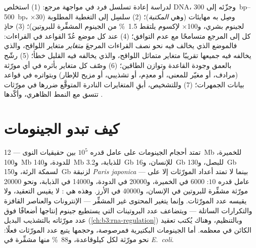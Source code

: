 \begin{method}\label{met:b3:genomics:pipeline}
لدراسة إعادة تسلسل فرد في مواجهة مرجع: (1)
استخلص DNA، وجزّئه إلى \qtyrange{300}{500}{bp}، وصِل به مهايئات
(وهي \emph{المكتبة})؛ (2) سلسِل إلى التغطية المطلوبة (30$\times$
لجينوم بشري، و100$\times$ لإكسوم يلتقط
\qty{1.5}{\%} من الجينوم المشفِّرة للبروتين)؛ (3) حاذِ كل
 إلى المرجع متسامحًا مع عدم التوافق؛ (4) عند كل موضع
عُدّ القواعد في القراءات: فالموضع الذي يخالف فيه نحو نصف القراءات
المرجعَ \emph{متغاير} متغاير اللواقح، والذي يخالفه فيه
جميعها تقريبًا متغاير متماثل اللواقح، والذي يخالفه فيه القليل خطأ؛
(5) رشّح بالعمق وجودة القاعدة وتوازن الطاقين؛ (6) وصّف كل
متغاير بأثره في أي مورّثة (مرادف، أو مغيّر للمعنى، أو معدِم، أو
تشذيبي، أو مزيح للإطار) وبتواتره في قواعد بيانات الجمهرات؛ (7)
وللتشخيص، أبقِ المتغايرات النادرة المتوقَّع ضررها في مورّثات
تتسق مع النمط الظاهري، وأكّدها .
\end{method}

\section{كيف تبدو الجينومات}

\begin{proposition}\label{prop:b3:genomics:sizes}
تمتد أحجام الجينومات على عامل قدره $10^{5}$ بين حقيقيات النوى ---
\qty{12}{Mb} للخميرة، و\qty{100}{Mb} للدودة، و\qty{140}{Mb}
للذبابة، و\qty{3.2}{Gb} للإنسان، و\qty{16}{Gb} للبصل،
و\qty{130}{Gb} لسمكة الرئة، و\qty{150}{Gb} لزنبقة \emph{Paris
japonica} --- بينما لا تمتد أعداد المورّثات إلا على عامل قدره $10$:
\num{6000} في الخميرة، و\num{20000} في الدودة، و\num{14000} في الذبابة،
ونحو \num{20000} مورّثة مشفِّرة للبروتين في الإنسان، و\num{40000} في الأرز.
وهذه هي \emph{}:  لا يقيس
التعقيد، ولا يقيسه عدد المورّثات. وإنما يتغير المحتوى غير المشفِّر
--- الإنترونات والعناصر القافزة والتكرارات الساتلة --- ويتضاعف
عدد البروتينات التي يستطيع جينوم إنتاجها أضعافًا فوق عدد مورّثاته
بالتشذيب البديل (\cref{ch:b3:rna-regulation})
وبالتنظيم، وهناك يُكتب تعقيد الكائن في معظمه. أما الجينومات
البكتيرية فمرصوصة، وحجمها يتبع عدد المورّثات فعلًا: نحو مورّثة
لكل كيلوقاعدة، و\qty{88}{\%} منها مشفِّرة في \emph{E.~coli}.
\end{proposition}

